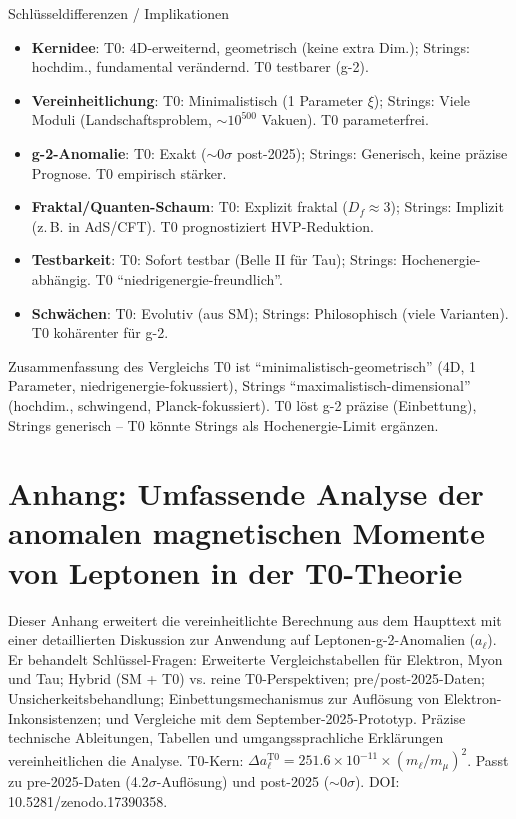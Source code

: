 \documentclass[12pt,a4paper]{article}
\begin{document}
	\begin{interpretation}{Schlüsseldifferenzen / Implikationen}
		\begin{itemize}
			\item \textbf{Kernidee}: T0: 4D-erweiternd, geometrisch (keine extra Dim.); Strings: hochdim., fundamental verändernd. T0 testbarer (g-2).
			\item \textbf{Vereinheitlichung}: T0: Minimalistisch (1 Parameter $\xi$); Strings: Viele Moduli (Landschaftsproblem, $\sim 10^{500}$ Vakuen). T0 parameterfrei.
			\item \textbf{g-2-Anomalie}: T0: Exakt ($\sim 0\sigma$ post-2025); Strings: Generisch, keine präzise Prognose. T0 empirisch stärker.
			\item \textbf{Fraktal/Quanten-Schaum}: T0: Explizit fraktal ($D_f \approx 3$); Strings: Implizit (z.\,B. in AdS/CFT). T0 prognostiziert HVP-Reduktion.
			\item \textbf{Testbarkeit}: T0: Sofort testbar (Belle II für Tau); Strings: Hochenergie-abhängig. T0 ``niedrigenergie-freundlich''.
			\item \textbf{Schwächen}: T0: Evolutiv (aus SM); Strings: Philosophisch (viele Varianten). T0 kohärenter für g-2.
		\end{itemize}
	\end{interpretation}
	
	\begin{result}{Zusammenfassung des Vergleichs}
		T0 ist ``minimalistisch-geometrisch'' (4D, 1 Parameter, niedrigenergie-fokussiert), Strings ``maximalistisch-dimensional'' (hochdim., schwingend, Planck-fokussiert). T0 löst g-2 präzise (Einbettung), Strings generisch -- T0 könnte Strings als Hochenergie-Limit ergänzen.
	\end{result}
	
	
	\appendix
	\section{Anhang: Umfassende Analyse der anomalen magnetischen Momente von Leptonen in der T0-Theorie}
	
	Dieser Anhang erweitert die vereinheitlichte Berechnung aus dem Haupttext mit einer detaillierten Diskussion zur Anwendung auf Leptonen-g-2-Anomalien ($a_\ell$). Er behandelt Schlüssel-Fragen: Erweiterte Vergleichstabellen für Elektron, Myon und Tau; Hybrid (SM + T0) vs. reine T0-Perspektiven; pre/post-2025-Daten; Unsicherkeitsbehandlung; Einbettungsmechanismus zur Auflösung von Elektron-Inkonsistenzen; und Vergleiche mit dem September-2025-Prototyp. Präzise technische Ableitungen, Tabellen und umgangssprachliche Erklärungen vereinheitlichen die Analyse. T0-Kern: $\Delta a_\ell^\text{T0} = 251.6 \times 10^{-11} \times (m_\ell / m_\mu)^2$. Passt zu pre-2025-Daten (4.2$\sigma$-Auflösung) und post-2025 ($\sim 0\sigma$). DOI: 10.5281/zenodo.17390358.
	
\end{document}
